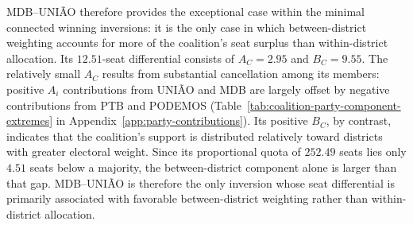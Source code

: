 \documentclass[11pt]{article}
\begin{document}


MDB--UNIÃO therefore provides the exceptional case within the
minimal connected winning inversions: it is the only case in which
between-district weighting accounts for more of the coalition's seat
surplus than within-district allocation. Its \(12.51\)-seat differential consists of
\(A_C=2.95\) and \(B_C=9.55\). The relatively small \(A_C\) results from
substantial cancellation among its members: positive \(A_i\) contributions from
UNIÃO and MDB are largely offset by negative contributions from PTB and PODEMOS
(Table~\ref{tab:coalition-party-component-extremes} in Appendix~\ref{app:party-contributions}). Its positive \(B_C\), by contrast,
indicates that the coalition's support is distributed relatively toward
districts with greater electoral weight. Since its proportional quota of
\(252.49\) seats lies only \(4.51\) seats below a majority, the between-district
component alone is larger than that gap. MDB--UNIÃO is therefore the only
inversion whose seat differential is primarily associated with favorable
between-district weighting rather than within-district allocation.
\end{document}
